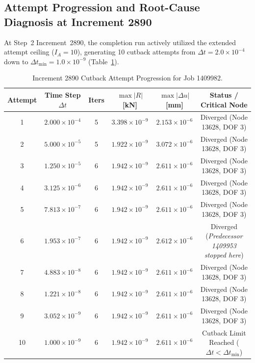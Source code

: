 \subsection{Attempt Progression and Root-Cause Diagnosis at Increment 2890}
\label{subsec:stage14uaf_attempt_root_cause}

At Step~2 Increment~2890, the completion run actively utilized the extended attempt ceiling ($I_A=10$), generating 10 cutback attempts from $\Delta t = 2.0\times 10^{-4}$ down to $\Delta t_{\min} = 1.0\times 10^{-9}$ (Table~\ref{tab:stage14uaf_attempt_progression}).

\begin{table}[htbp]
\centering
\small
\caption{Increment 2890 Cutback Attempt Progression for Job 1409982.}
\label{tab:stage14uaf_attempt_progression}
\begin{tabular}{cccccc}
\hline
\textbf{Attempt} & \textbf{Time Step $\Delta t$} & \textbf{Iters} & $\max |R|$ [kN] & $\max |\Delta u|$ [mm] & \textbf{Status / Critical Node} \\
\hline
1 & $2.000\times 10^{-4}$ & 5 & $3.398\times 10^{-9}$ & $2.153\times 10^{-6}$ & Diverged (Node 13628, DOF 3) \\
2 & $5.000\times 10^{-5}$ & 5 & $1.922\times 10^{-9}$ & $3.072\times 10^{-6}$ & Diverged (Node 13628, DOF 3) \\
3 & $1.250\times 10^{-5}$ & 6 & $1.942\times 10^{-9}$ & $2.611\times 10^{-6}$ & Diverged (Node 13628, DOF 3) \\
4 & $3.125\times 10^{-6}$ & 6 & $1.942\times 10^{-9}$ & $2.611\times 10^{-6}$ & Diverged (Node 13628, DOF 3) \\
5 & $7.813\times 10^{-7}$ & 6 & $1.942\times 10^{-9}$ & $2.611\times 10^{-6}$ & Diverged (Node 13628, DOF 3) \\
6 & $1.953\times 10^{-7}$ & 6 & $1.942\times 10^{-9}$ & $2.612\times 10^{-6}$ & Diverged (\emph{Predecessor 1409953 stopped here}) \\
7 & $4.883\times 10^{-8}$ & 6 & $1.942\times 10^{-9}$ & $2.611\times 10^{-6}$ & Diverged (Node 13628, DOF 3) \\
8 & $1.221\times 10^{-8}$ & 6 & $1.942\times 10^{-9}$ & $2.611\times 10^{-6}$ & Diverged (Node 13628, DOF 3) \\
9 & $3.052\times 10^{-9}$ & 6 & $1.942\times 10^{-9}$ & $2.611\times 10^{-6}$ & Diverged (Node 13628, DOF 3) \\
10 & $1.000\times 10^{-9}$ & 6 & $1.942\times 10^{-9}$ & $2.611\times 10^{-6}$ & Cutback Limit Reached ($\Delta t < \Delta t_{\min}$) \\
\hline
\end{tabular}
\end{table}

